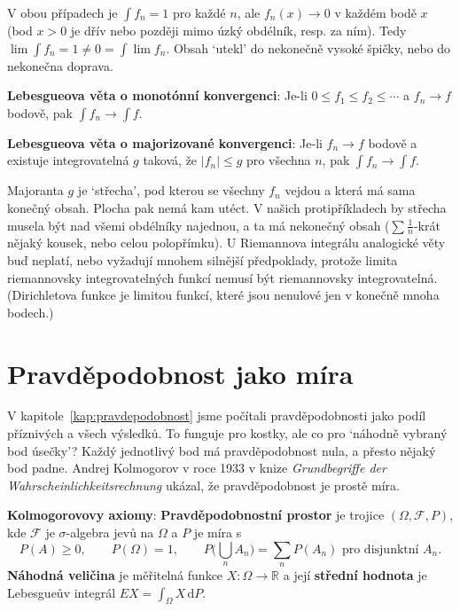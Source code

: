 V obou případech je $\int f_n = 1$ pro každé $n$, ale $f_n(x)\to 0$ v každém bodě $x$ (bod $x > 0$ je dřív nebo později mimo úzký obdélník, resp. za ním). Tedy $\lim\int f_n = 1\neq 0 = \int\lim f_n$. Obsah `utekl' do nekonečně vysoké špičky, nebo do nekonečna doprava.

\begin{definitionbox}
  \textbf{Lebesgueova věta o monotónní konvergenci}: Je-li $0\leq f_1\leq f_2\leq\cdots$ a $f_n\to f$ bodově, pak $\int f_n\to\int f$.

  \vspace{0.2cm}

  \textbf{Lebesgueova věta o majorizované konvergenci}: Je-li $f_n\to f$ bodově a existuje integrovatelná $g$ taková, že $|f_n|\leq g$ pro všechna $n$, pak $\int f_n\to\int f$.
\end{definitionbox}

Majoranta $g$ je `střecha', pod kterou se všechny $f_n$ vejdou a která má sama konečný obsah. Plocha pak nemá kam utéct. V našich protipříkladech by střecha musela být nad všemi obdélníky najednou, a ta má nekonečný obsah ($\sum\frac{1}{n}$-krát nějaký kousek, nebo celou polopřímku). U Riemannova integrálu analogické věty buď neplatí, nebo vyžadují mnohem silnější předpoklady, protože limita riemannovsky integrovatelných funkcí nemusí být riemannovsky integrovatelná. (Dirichletova funkce je limitou funkcí, které jsou nenulové jen v konečně mnoha bodech.)

\section{Pravděpodobnost jako míra}

V kapitole~\ref{kap:pravdepodobnost} jsme počítali pravděpodobnosti jako podíl příznivých a všech výsledků. To funguje pro kostky, ale co pro `náhodně vybraný bod úsečky'? Každý jednotlivý bod má pravděpodobnost nula, a přesto nějaký bod padne. Andrej Kolmogorov v roce 1933 v knize \textit{Grundbegriffe der Wahrscheinlichkeitsrechnung} ukázal, že pravděpodobnost je prostě míra.

\begin{definitionbox}
  \textbf{Kolmogorovovy axiomy}: \textbf{Pravděpodobnostní prostor} je trojice $(\Omega, \mathcal{F}, P)$, kde $\mathcal{F}$ je $\sigma$-algebra jevů na $\Omega$ a $P$ je míra s
  \begin{equation*}
    P(A)\geq 0,\qquad P(\Omega) = 1,\qquad P\Big(\bigcup_n A_n\Big) = \sum_n P(A_n)\text{ pro disjunktní }A_n.
  \end{equation*}
  \textbf{Náhodná veličina} je měřitelná funkce $X\colon\Omega\to\mathbb{R}$ a její \textbf{střední hodnota} je Lebesgueův integrál $E X = \int_\Omega X\,\mathrm{d}P$.
\end{definitionbox}


